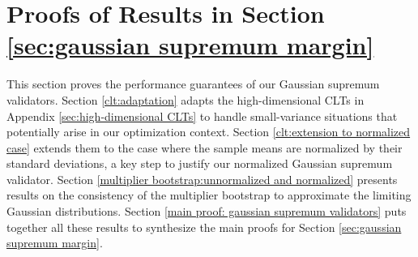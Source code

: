 \documentclass[mnsc,blindrev]{informs4} %
\begin{document}
\section{Proofs of Results in Section \ref{sec:gaussian supremum margin}}
This section proves the performance guarantees of our Gaussian supremum validators. Section \ref{clt:adaptation} adapts the high-dimensional CLTs in Appendix \ref{sec:high-dimensional CLTs} to handle small-variance situations that potentially arise in our optimization context. Section \ref{clt:extension to normalized case} extends them to the case where the sample means are normalized by their standard deviations, a key step to justify our normalized Gaussian supremum validator. Section \ref{multiplier bootstrap:unnormalized and normalized} presents results on the consistency of the multiplier bootstrap to approximate the limiting Gaussian distributions. Section \ref{main proof: gaussian supremum validators} puts together all these results to synthesize the main proofs for Section \ref{sec:gaussian supremum margin}.
\end{document}
